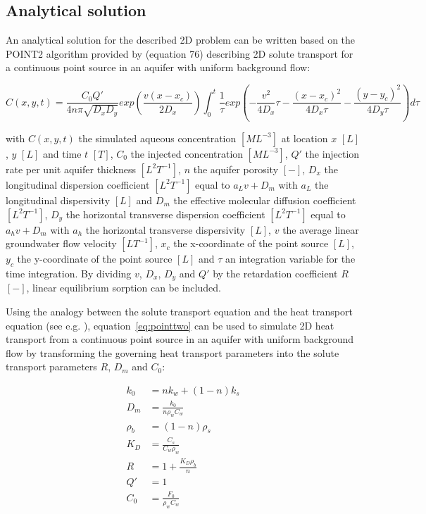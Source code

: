 

\subsection{Analytical solution}

An analytical solution for the described 2D problem can be written based on the POINT2 algorithm provided by \cite{wexler1992} (equation 76) describing 2D solute transport for a continuous point source in an aquifer with uniform background flow:

\begin{equation}
    C(x,y,t) = \frac{C_0Q'}{4n\pi\sqrt{D_xD_y}}exp(\frac{v(x-x_c)}{2D_x})\int_0^t\frac{1}{\tau} exp(-\frac{v^2}{4D_x}\tau - \frac{(x-x_c)^2}{4D_x\tau}-\frac{(y-y_c)^2}{4D_y\tau})d\tau
    \label{eq:pointtwo}
\end{equation}

with $C(x,y,t)$ the simulated aqueous concentration $[ML^{-3}]$ at location $x$ $[L]$, $y$ $[L]$ and time $t$ $[T]$, $C_0$ the injected concentration $[ML^{-3}]$, $Q'$ the injection rate per unit aquifer thickness $[L^2T^{-1}]$, $n$ the aquifer porosity $[-]$, $D_x$ the longitudinal dispersion coefficient $[L^2T^{-1}]$ equal to $a_Lv + D_m$ with $a_L$ the longitudinal dispersivity $[L]$ and $D_m$ the effective molecular diffusion coefficient $[L^2T^{-1}]$, $D_y$ the horizontal transverse dispersion coefficient $[L^2T^{-1}]$ equal to $a_hv + D_m$ with $a_h$ the horizontal transverse dispersivity $[L]$, $v$ the average linear groundwater flow velocity $[LT^{-1}]$, $x_c$ the x-coordinate of the point source $[L]$, $y_c$ the y-coordinate of the point source $[L]$ and $\tau$ an integration variable for the time integration. By dividing $v$, $D_x$, $D_y$ and $Q'$ by the retardation coefficient $R$ $[-]$, linear equilibrium sorption can be included.

Using the analogy between the solute transport equation and the heat transport equation (see e.g. \cite{zheng2010mt3dmsv5.3}), equation~\ref{eq:pointtwo} can be used to simulate 2D heat transport from a continuous point source in an aquifer with uniform background flow by transforming the governing heat transport parameters into the solute transport parameters $R$, $D_m$ and $C_0$:

\begin{align}
    k_0 &= n k_w + (1 - n) k_s \\
    D_m &= \frac{k_0}{n  \rho_w  C_w} \\
    \rho_b &= (1 - n) \rho_s \\
    K_D &= \frac{C_s}{C_w \rho_w} \\
    R &= 1 + \frac{K_D \rho_b}{n} \\
    Q' &= 1 \\
    C_0 &= \frac{F_0}{\rho_w C_w} \\
\end{align}

